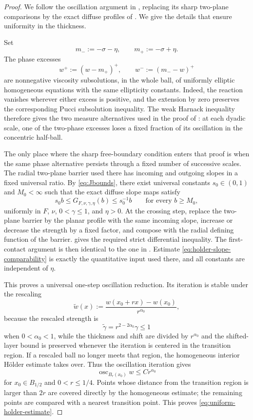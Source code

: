 \documentclass[11pt,letterpaper]{amsart}
\numberwithin{equation}{section}
\DeclareMathOperator{\osc}{osc}
\theoremstyle{definition}
\theoremstyle{remark}
\begin{document}
\begin{proof}
We follow the oscillation argument in
\cite[Theorem~2.2]{DeSilvaSavin}, replacing its sharp two-plane
comparisons by the exact diffuse profiles of
.  We give the details that ensure
uniformity in the thickness.

Set
$$
m_-:=-\sigma-\eta,
\qquad
m_+:=-\sigma+\eta.
$$
The phase excesses
$$
w^+:=(w-m_+)^+,
\qquad
w^-:=(m_--w)^+
$$
are nonnegative viscosity subsolutions, in the whole ball, of uniformly
elliptic homogeneous equations with the same ellipticity constants.  Indeed,
the reaction vanishes wherever either excess is positive, and the extension
by zero preserves the corresponding Pucci subsolution inequality.  The weak
Harnack inequality therefore gives the two measure alternatives used in the
proof of \cite[Theorem~2.2]{DeSilvaSavin}: at each dyadic scale, one of the
two-phase excesses loses a fixed fraction of its oscillation in the
concentric half-ball.

The only place where the sharp free-boundary condition enters that proof is
when the same phase alternative persists through a fixed number of
successive scales.  The radial two-plane barrier used there has incoming
and outgoing slopes in a fixed universal ratio.  By
\eqref{eq:Jbounds}, there exist universal constants $s_0\in(0,1)$ and
$M_0<\infty$ such that the exact diffuse slope maps satisfy
\begin{equation}\label{eq:holder-slope-comparability}
s_0 b
\leq
G_{F,\nu,\gamma,\eta}(b)
\leq
s_0^{-1}b
\qquad
\text{for every }b\geq M_0,
\end{equation}
uniformly in $F$, $\nu$, $0<\gamma\leq1$, and $\eta>0$.
At the crossing step, replace the two-plane barrier by the planar profile
with the same incoming slope, increase or decrease the strength by a fixed
factor, and compose with the radial defining function of the barrier.
 gives the required strict differential
inequality.  The first-contact argument is then identical to the one in
\cite[Theorem~2.2]{DeSilvaSavin}.  Estimate
\eqref{eq:holder-slope-comparability} is exactly the quantitative input used
there, and all constants are independent of $\eta$.

This proves a universal one-step oscillation reduction.  Its iteration is
stable under the rescaling
$$
\widetilde w(x)
:=
\frac{w(x_0+rx)-w(x_0)}{r^{\alpha_0}},
$$
because the rescaled strength is
$$
\widetilde\gamma
=
r^{2-2\alpha_0}\gamma
\leq1
$$
when $0<\alpha_0<1$, while the thickness and shift are divided by
$r^{\alpha_0}$ and the shifted-layer bound is preserved whenever the
iteration is centered in the transition region.  If a rescaled ball no
longer meets that region, the homogeneous interior H\"older estimate takes
over.  Thus the oscillation iteration gives
$$
\osc_{B_r(x_0)}w
\leq Cr^{\alpha_0}
$$
for $x_0\in B_{1/2}$ and $0<r\leq1/4$.  Points whose distance from the
transition region is larger than $2r$ are covered directly by the
homogeneous estimate; the remaining points are compared with a nearest
transition point.  This proves \eqref{eq:uniform-holder-estimate}.
\end{proof}
\end{document}
